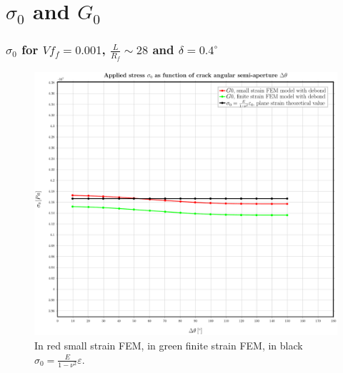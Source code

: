 \documentclass[first,firstsupp,lastsupp,handout,last,hyperref,table]{ETHclass}
\begin{document}
\section{$\sigma_{0}$ and $G_{0}$}

\begin{frame}
\frametitle{\small $\sigma_{0}$ for $Vf_{f}=0.001$, $\frac{L}{R_{f}}\sim28$ and $\delta=0.4^{\circ}$}
\vspace{-0.5cm}
\centering
\captionsetup[figure]{font=scriptsize,labelfont=scriptsize}
\begin{figure}[!h]
\centering
\includegraphics[height=0.7\textheight]{2017-06-23_AbqRunSummary_SingleFiberEqRfSmallFiniteStrain_sigma-inf_Summary.pdf}
  \caption{\scriptsize In red small strain FEM, in green finite strain FEM, in black $\sigma_{0}=\frac{E}{1-\nu^{2}}\varepsilon$.}
  \label{fig:res1}
\end{figure}
\end{frame}
\end{document}
